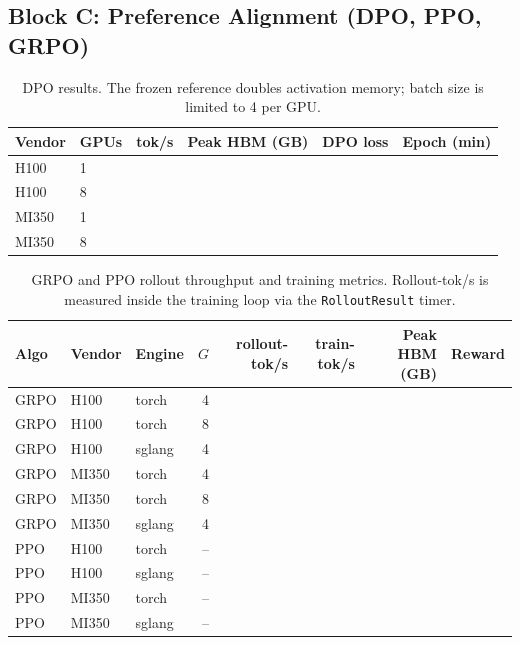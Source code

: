 \subsection{Block C: Preference Alignment (DPO, PPO, GRPO)}
\label{sec:training:rlhf}

\begin{table}[h]
\centering
\caption{DPO results. The frozen reference doubles activation memory;
 batch size is limited to 4 per GPU.}
\label{tab:dpo}
\small
\begin{tabular}{llrrrr}
\toprule
\textbf{Vendor} & \textbf{GPUs} &
\textbf{tok/s} & \textbf{Peak HBM (GB)} &
\textbf{DPO loss} & \textbf{Epoch (min)} \\
\midrule
H100  & 1 & \PH{} & \PH{} & \PH{} & \PH{} \\
H100  & 8 & \PH{} & \PH{} & \PH{} & \PH{} \\
MI350 & 1 & \PH{} & \PH{} & \PH{} & \PH{} \\
MI350 & 8 & \PH{} & \PH{} & \PH{} & \PH{} \\
\bottomrule
\end{tabular}
\end{table}

\begin{table}[h]
\centering
\caption{GRPO and PPO rollout throughput and training metrics.
Rollout-tok/s is measured inside the training loop via the \texttt{RolloutResult} timer.}
\label{tab:rlhf}
\small
\begin{tabular}{lllrrrrr}
\toprule
\textbf{Algo} & \textbf{Vendor} & \textbf{Engine} &
\textbf{$G$} & \textbf{rollout-tok/s} & \textbf{train-tok/s} &
\textbf{Peak HBM (GB)} & \textbf{Reward} \\
\midrule
GRPO & H100  & torch  & 4 & \PH{} & \PH{} & \PH{} & \PH{} \\
GRPO & H100  & torch  & 8 & \PH{} & \PH{} & \PH{} & \PH{} \\
GRPO & H100  & sglang & 4 & \PH{} & \PH{} & \PH{} & \PH{} \\
GRPO & MI350 & torch  & 4 & \PH{} & \PH{} & \PH{} & \PH{} \\
GRPO & MI350 & torch  & 8 & \PH{} & \PH{} & \PH{} & \PH{} \\
GRPO & MI350 & sglang & 4 & \PH{} & \PH{} & \PH{} & \PH{} \\
\midrule
PPO  & H100  & torch  & -- & \PH{} & \PH{} & \PH{} & \PH{} \\
PPO  & H100  & sglang & -- & \PH{} & \PH{} & \PH{} & \PH{} \\
PPO  & MI350 & torch  & -- & \PH{} & \PH{} & \PH{} & \PH{} \\
PPO  & MI350 & sglang & -- & \PH{} & \PH{} & \PH{} & \PH{} \\
\bottomrule
\end{tabular}
\end{table}

